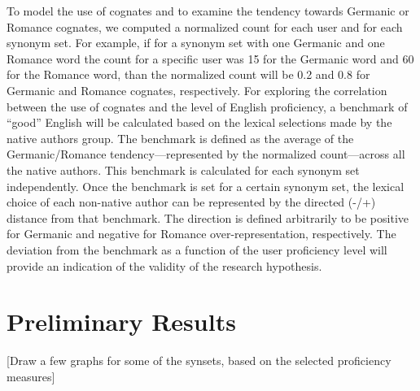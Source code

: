 \documentclass[11pt]{article}
\newcommand{\note}[1]{\textit{\small\color{magenta}{#1}}}
\begin{document}
\note{This is still too vague. Recall the research hypothesis and try to first explain, in simple non-technical terms, how your planned work is going to address and answer it. In particular, say something about Romance vs.\ Germanic, it is not at all clear from the current presentation.}

To model the use of cognates and to examine the tendency towards Germanic or Romance cognates, we computed a normalized count for each user and for each synonym set. 
For example, if for a synonym set with one Germanic and one Romance word the count for a specific user was 15 for the Germanic word and 60 for the Romance word, than the normalized count will be 0.2 and 0.8 for Germanic and Romance cognates, respectively.
For exploring the correlation between the use of cognates and the level of English proficiency, a benchmark of ``good'' English will be calculated based on the lexical selections made by the native authors group. The benchmark is defined as the average of the Germanic/Romance tendency---represented by the normalized count---across all the native authors. This benchmark is calculated for each synonym set independently.
Once the benchmark is set for a certain synonym set, the lexical choice of each non-native author can be represented by the directed (-/+) distance from that benchmark. The direction is defined arbitrarily to be positive for Germanic and negative for Romance over-representation, respectively.  The deviation from the benchmark as a function of the user proficiency level will provide an indication of the validity of the research hypothesis.


\section{Preliminary Results}

[Draw a few graphs for some of the synsets, based on the selected proficiency measures]




\end{document}
